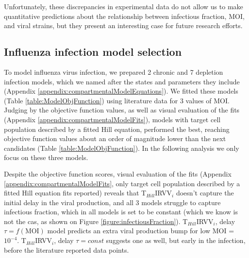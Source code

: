 Unfortunately, these discrepancies in experimental data do not allow us to make quantitative predictions about the relationship between infectious fraction, MOI, and viral strains, but they present an interesting case for future research efforts.

\subsection{Influenza infection model selection}

To model influenza virus infection, we prepared 2 chronic and 7 depletion infection models, which we named after the states and parameters they include (Appendix \ref{appendix:compartmentalModelEquations}). We fitted these models (Table \ref{table:ModelObjFunction}) using literature data \cite{rudiger2019multiscale, frensing2016influenza} for 3 values of MOI. Judging by the objective function values, as well as visual evaluation of the fits (Appendix \ref{appendix:compartmentalModelFits}), models with target cell population described by a fitted Hill equation, performed the best, reaching objective function values about an order of magnitude lower than the next candidates (Table \ref{table:ModelObjFunction}). In the following analysis we only focus on these three models.

Despite the objective function scores, visual evaluation of the fits (Appendix \ref{appendix:compartmentalModelFits}, only target cell population described by a fitted Hill equation fits reported) reveals that T$_{Hill}$IRVV$_i$ doesn't capture the initial delay in the viral production, and all 3 models struggle to capture infectious fraction, which in all models is set to be constant (which we know is not the cas, as shown on Figure \ref{figure:infectiousFraction}). T$_{Hill}$IRVV$_i$, delay $\tau = f(\text{MOI})$ model predicts an extra viral production bump for low MOI = $10^{-4}$. T$_{Hill}$IRVV$_i$, delay $\tau = const$ suggests one as well, but early in the infection, before the literature reported data points.

